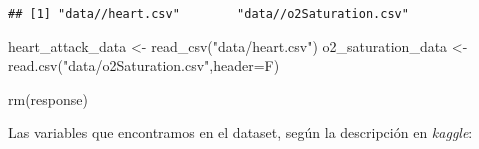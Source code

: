 \documentclass[
]{article}
\newenvironment{Shaded}{\begin{snugshade}}{\end{snugshade}}
\newcommand{\AttributeTok}[1]{\textcolor[rgb]{0.77,0.63,0.00}{#1}}
\newcommand{\FunctionTok}[1]{\textcolor[rgb]{0.00,0.00,0.00}{#1}}
\newcommand{\NormalTok}[1]{#1}
\newcommand{\OtherTok}[1]{\textcolor[rgb]{0.56,0.35,0.01}{#1}}
\newcommand{\StringTok}[1]{\textcolor[rgb]{0.31,0.60,0.02}{#1}}
\begin{document}
\begin{verbatim}
## [1] "data//heart.csv"        "data//o2Saturation.csv"
\end{verbatim}

\begin{Shaded}
\begin{Highlighting}[]
\NormalTok{heart\_attack\_data }\OtherTok{\textless{}{-}} \FunctionTok{read\_csv}\NormalTok{(}\StringTok{"data/heart.csv"}\NormalTok{)}
\NormalTok{o2\_saturation\_data }\OtherTok{\textless{}{-}} \FunctionTok{read.csv}\NormalTok{(}\StringTok{"data/o2Saturation.csv"}\NormalTok{,}\AttributeTok{header=}\NormalTok{F)}

\FunctionTok{rm}\NormalTok{(response)}
\end{Highlighting}
\end{Shaded}

Las variables que encontramos en el dataset, según la descripción en
\emph{kaggle}:
\end{document}
